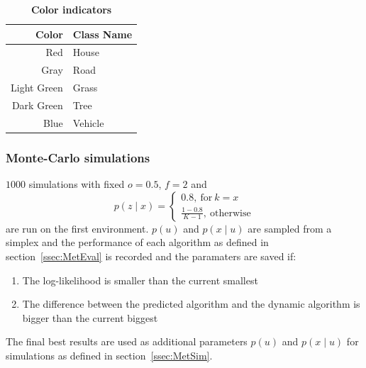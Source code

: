 \documentclass[twocolumn,letterpaper]{IEEEAerospaceCLS}  %
\begin{document}
\begin{table}[]
    \renewcommand{\arraystretch}{1.3}
    \caption{\bf Color indicators}
    \label{tab:colors}
    \centering
    \begin{tabular}{|r||l|}
        \hline
        \bfseries Color      & \bfseries Class Name    \\
        \hline \hline
        Red &  House\\
        \hline
        Gray  & Road         \\
        \hline
        Light Green     & Grass              \\
        \hline
        Dark Green & Tree           \\
        \hline
        Blue & Vehicle \\
        \hline
    \end{tabular}
\end{table}

\subsubsection{Monte-Carlo simulations} \label{ssec:MetMC}
$1000$ simulations with fixed $o=0.5$, $f=2$ and
\begin{equation}
    p(z\mid x)=
    \begin{cases}
        0.8,~\text{for}~k=x \\
        \frac{1-0.8}{K-1},~\text{otherwise}
    \end{cases}
\end{equation}
are run on the first environment. $p(u)$ and $p(x\mid u)$ are sampled from a simplex and the performance of each algorithm as defined in section~\ref{ssec:MetEval} is recorded and the paramaters are saved if:
\begin{enumerate}
    \item The log-likelihood is smaller than the current smallest
    \item The difference between the predicted algorithm and the dynamic algorithm is bigger than the current biggest
\end{enumerate}
The final best results are used as additional parameters $p(u)$ and $p(x\mid u)$ for simulations as defined in section~\ref{ssec:MetSim}.
\end{document}
